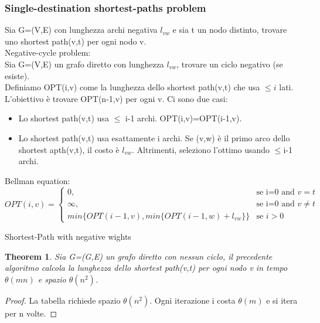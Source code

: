\documentclass{article}
\newtheorem{theorem}{Theorem}[subsection]
\begin{document}
\subsubsection{Single-destination shortest-paths problem}
Sia G=(V,E) con lunghezza archi negativa $l_{vw}$ e sia t un nodo distinto, trovare uno shortest path(v,t) per ogni nodo v.\\
Negative-cycle problem:\\
Sia G=(V,E) un grafo diretto con lunghezza $l_{vw}$, trovare un ciclo negativo (se esiste).\\
Definiamo OPT(i,v) come la lunghezza dello shortest path(v,t) che usa $\leq i$ lati. L'obiettivo è trovare OPT(n-1,v) per ogni v.
Ci sono due casi:
\begin{itemize}
    \item Lo shortest path(v,t) usa $\leq$ i-1 archi. OPT(i,v)=OPT(i-1,v).
    \item Lo shortest path(v,t) usa esattamente i archi. Se (v,w) è il primo arco dello shortest apth(v,t), il costo è $l_{vw}$. Altrimenti, seleziono l'ottimo usando $\leq$i-1 archi.
\end{itemize}
Bellman equation:\\
\[
OPT(i, v) =\begin{cases} 0, & \mbox{se i=0 and }v=t \\ \infty, & \mbox{se i=0 and }v \neq t \\ min\{OPT(i-1,v), min\{OPT(i-1,w)+l_{vw}\}\}& \mbox{se }i  > 0 
\end{cases}
\]
\begin{center}
\begin{algorithm}
\caption{Shortest-Path with negative wights}
\end{algorithm}
\end{center}
\begin{theorem}
    Sia G=(G,E) un grafo diretto con nessun ciclo, il precedente algoritmo calcola la lunghezza dello shortest path(v,t) per ogni nodo v in tempo $\theta(mn)$ e spazio $\theta(n^2)$.
\end{theorem}
\begin{proof}
    La tabella richiede spazio $\theta(n^2)$. Ogni iterazione i costa $\theta(m)$ e si itera per n volte.
\end{proof}
\end{document}
